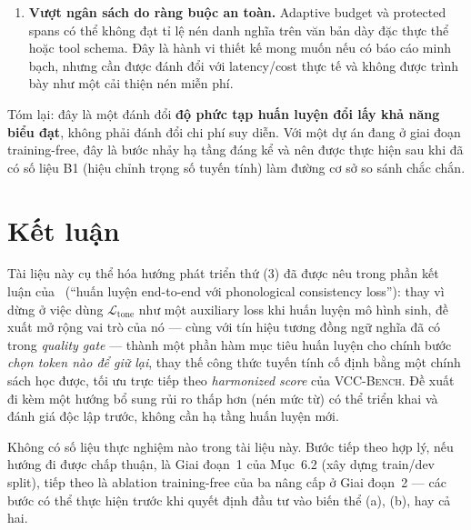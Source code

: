 \documentclass[12pt,a4paper]{article}
\newcommand{\method}[1]{\textsc{#1}}         %
\begin{document}
\begin{enumerate}[label=\textbf{R\arabic*}:,leftmargin=*]
    \item \textbf{Vượt ngân sách do ràng buộc an toàn.} Adaptive budget và protected spans có thể không đạt tỉ lệ nén danh nghĩa trên văn bản dày đặc thực thể hoặc tool schema. Đây là hành vi thiết kế mong muốn nếu có báo cáo minh bạch, nhưng cần được đánh đổi với latency/cost thực tế và không được trình bày như một cải thiện nén miễn phí.
\end{enumerate}

Tóm lại: đây là một đánh đổi \textbf{độ phức tạp huấn luyện đổi lấy khả năng biểu đạt}, không phải đánh đổi chi phí suy diễn. Với một dự án đang ở giai đoạn training-free, đây là bước nhảy hạ tầng đáng kể và nên được thực hiện sau khi đã có số liệu B1 (hiệu chỉnh trọng số tuyến tính) làm đường cơ sở so sánh chắc chắn.


\section{Kết luận}

Tài liệu này cụ thể hóa hướng phát triển thứ (3) đã được nêu trong phần kết luận của~\cite{lacc2026} (``huấn luyện end-to-end với phonological consistency loss''): thay vì dừng ở việc dùng $\mathcal{L}_{\text{tone}}$ như một auxiliary loss khi huấn luyện mô hình sinh, đề xuất mở rộng vai trò của nó --- cùng với tín hiệu tương đồng ngữ nghĩa đã có trong \textit{quality gate} --- thành một phần hàm mục tiêu huấn luyện cho chính bước \emph{chọn token nào để giữ lại}, thay thế công thức tuyến tính cố định bằng một chính sách học được, tối ưu trực tiếp theo \textit{harmonized score} của \method{VCC-Bench}. Đề xuất đi kèm một hướng bổ sung rủi ro thấp hơn (nén mức từ) có thể triển khai và đánh giá độc lập trước, không cần hạ tầng huấn luyện mới.

Không có số liệu thực nghiệm nào trong tài liệu này. Bước tiếp theo hợp lý, nếu hướng đi được chấp thuận, là Giai đoạn~1 của Mục~6.2 (xây dựng train/dev split), tiếp theo là ablation training-free của ba nâng cấp ở Giai đoạn~2 --- các bước có thể thực hiện trước khi quyết định đầu tư vào biến thể (a), (b), hay cả hai.
\end{document}
